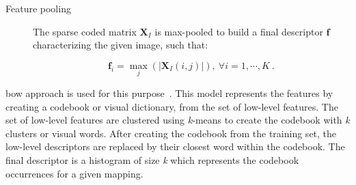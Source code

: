 \begin{description}
\item[Feature pooling] The sparse coded matrix $\mathbf{X}_{I}$ is max-pooled to build a final descriptor $\mathbf{f}$ characterizing the given image, such that:

\begin{equation}
  \mathbf{f}_i = \max_{j}\left(|\mathbf{X}_{I}(i,j)|\right), \ \forall i = 1, \cdots, K\ .
\end{equation}

\end{description}


\ac{bow} approach is used for this purpose~\cite{Sivic2003}.
This model represents the features by creating a codebook or visual dictionary, from the set of low-level features.
The set of low-level features are clustered using \textit{k}-means to create the codebook with \textit{k} clusters or visual words.
After creating the codebook from the training set, the low-level descriptors are replaced by their closest word within the codebook.
The final descriptor is a histogram of size \textit{k} which represents the codebook occurrences for a given mapping.



